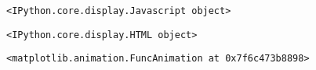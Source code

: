 \documentclass[11pt]{article}
\newcommand{\prompt}[4]{
        \llap{{\color{#2}[#3]: #4}}\vspace{-1.25em}
    }
\begin{document}
    
    \begin{verbatim}
<IPython.core.display.Javascript object>
    \end{verbatim}

    
    
    \begin{verbatim}
<IPython.core.display.HTML object>
    \end{verbatim}

    
            \begin{tcolorbox}[breakable, boxrule=.5pt, size=fbox, pad at break*=1mm, opacityfill=0]
\prompt{Out}{outcolor}{8}{\hspace{3.5pt}}
\begin{Verbatim}[commandchars=\\\{\}]
<matplotlib.animation.FuncAnimation at 0x7f6c473b8898>
\end{Verbatim}
\end{tcolorbox}
        

    
    
    
    
\end{document}
